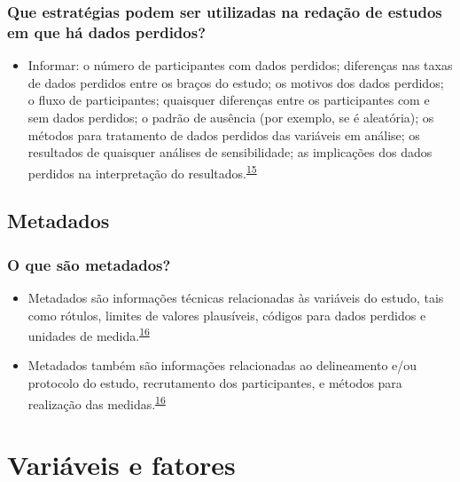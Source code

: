 \documentclass[
]{book}
\providecommand{\tightlist}{%
  \setlength{\itemsep}{0pt}\setlength{\parskip}{0pt}}
\begin{document}
\hypertarget{que-estratuxe9gias-podem-ser-utilizadas-na-redauxe7uxe3o-de-estudos-em-que-huxe1-dados-perdidos}{%
\subsection{Que estratégias podem ser utilizadas na redação de estudos em que há dados perdidos?}\label{que-estratuxe9gias-podem-ser-utilizadas-na-redauxe7uxe3o-de-estudos-em-que-huxe1-dados-perdidos}}

\begin{itemize}
\tightlist
\item
  Informar: o número de participantes com dados perdidos; diferenças nas taxas de dados perdidos entre os braços do estudo; os motivos dos dados perdidos; o fluxo de participantes; quaisquer diferenças entre os participantes com e sem dados perdidos; o padrão de ausência (por exemplo, se é aleatória); os métodos para tratamento de dados perdidos das variáveis em análise; os resultados de quaisquer análises de sensibilidade; as implicações dos dados perdidos na interpretação do resultados.\textsuperscript{\protect\hyperlink{ref-Akl2015}{15}}
\end{itemize}

\hypertarget{metadados}{%
\section{Metadados}\label{metadados}}

\hypertarget{o-que-suxe3o-metadados}{%
\subsection{O que são metadados?}\label{o-que-suxe3o-metadados}}

\begin{itemize}
\item
  Metadados são informações técnicas relacionadas às variáveis do estudo, tais como rótulos, limites de valores plausíveis, códigos para dados perdidos e unidades de medida.\textsuperscript{\protect\hyperlink{ref-Baillie2022}{16}}
\item
  Metadados também são informações relacionadas ao delineamento e/ou protocolo do estudo, recrutamento dos participantes, e métodos para realização das medidas.\textsuperscript{\protect\hyperlink{ref-Baillie2022}{16}}
\end{itemize}

\hypertarget{variaveis-fatores}{%
\chapter{\texorpdfstring{\textbf{Variáveis e fatores}}{Variáveis e fatores}}\label{variaveis-fatores}}
\end{document}
